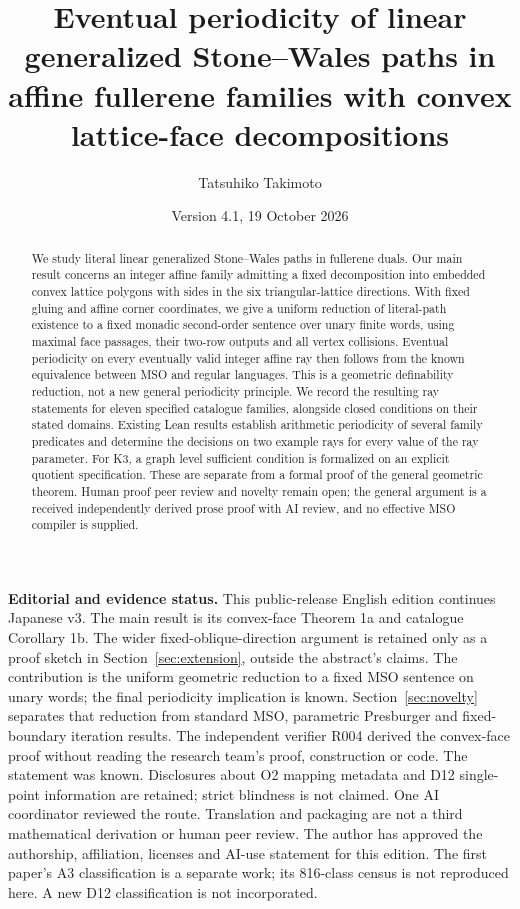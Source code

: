 \documentclass[11pt]{amsart}
\title[Affine fullerene families and eventual periodicity]{Eventual periodicity of linear generalized Stone--Wales paths in affine fullerene families with convex lattice-face decompositions}
\author{Tatsuhiko Takimoto}
\date{Version 4.1, 19 October 2026}
\theoremstyle{definition}\newtheorem{definition}{Definition}
\begin{document}
\begin{abstract}
We study literal linear generalized Stone--Wales paths in fullerene
duals. Our main result concerns an integer affine family admitting a
fixed decomposition into embedded convex lattice polygons with sides
in the six triangular-lattice directions. With fixed gluing and affine
corner coordinates, we give a uniform reduction of literal-path
existence to a fixed monadic second-order sentence over unary finite
words, using maximal face passages, their two-row outputs and all
vertex collisions. Eventual periodicity on every eventually valid
integer affine ray then follows from the known equivalence between
MSO and regular languages. This is a geometric definability reduction,
not a new general periodicity principle. We record
the resulting ray statements for eleven specified catalogue families,
alongside closed conditions on their stated domains. Existing Lean
results establish arithmetic periodicity of several family predicates
and determine the decisions on two example rays for every value of the ray parameter. For K3, a graph
level sufficient condition is formalized on an explicit quotient
specification. These are separate from a formal proof of the general
geometric theorem. Human proof peer review and novelty remain open;
the general argument is a received independently derived prose proof
with AI review, and no effective MSO compiler is supplied.
\end{abstract}
\maketitle

\noindent\textbf{Editorial and evidence status.}
This public-release English edition continues Japanese v3. The
main result is its convex-face Theorem 1a and catalogue Corollary 1b.
The wider fixed-oblique-direction argument is retained only as a proof
sketch in Section~\ref{sec:extension}, outside the abstract's claims.
The contribution is the uniform geometric reduction to a fixed MSO
sentence on unary words; the final periodicity implication is known.
Section~\ref{sec:novelty} separates that reduction from standard
MSO, parametric Presburger and fixed-boundary iteration results.
The independent verifier R004 derived the convex-face proof without
reading the research team's proof, construction or code. The statement
was known. Disclosures about O2 mapping metadata and D12 single-point
information are retained; strict blindness is not claimed. One AI
coordinator reviewed the route. Translation and packaging are not a
third mathematical derivation or human peer review. The author has approved the authorship, affiliation, licenses and
AI-use statement for this edition. The first paper's
A3 classification is a separate work; its 816-class census is not
reproduced here. A new D12 classification is not incorporated.
\end{document}
